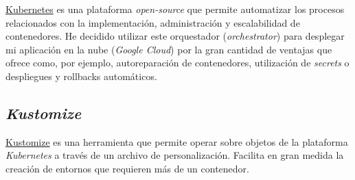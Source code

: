 \href{https://kubernetes.io/es/}{Kubernetes} es una plataforma
\emph{open-source} que permite automatizar los procesos relacionados con
la implementación, administración y escalabilidad de contenedores. He
decidido utilizar este orquestador (\emph{orchestrator}) para desplegar
mi aplicación en la nube (\emph{Google Cloud}) por la gran cantidad de
ventajas que ofrece como, por ejemplo, autoreparación de contenedores,
utilización de \emph{secrets} o despliegues y rollbacks automáticos.

\subsection{\emph{Kustomize}}

\href{https://github.com/kubernetes-sigs/kustomize}{Kustomize} es una
herramienta que permite operar sobre objetos de la plataforma
\emph{Kubernetes} a través de un archivo de personalización. Facilita en gran medida
la creación de entornos que requieren más de un contenedor.